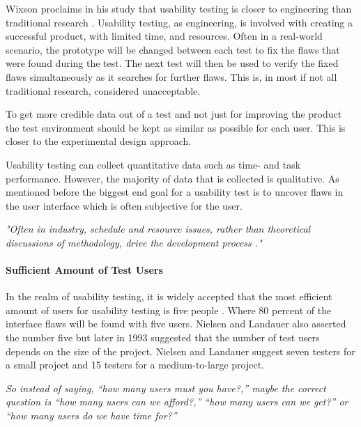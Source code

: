 Wixson proclaims in his study that usability testing is closer to engineering than traditional research \cite{wixon2003evaluating}. Usability testing, as engineering, is involved with creating a successful product, with limited time, and resources. Often in a real-world scenario, the prototype will be changed between each test to fix the flaws that were found during the test. The next test will then be used to verify the fixed flaws simultaneously as it searches for further flaws. This is, in most if not all traditional research, considered unacceptable. 

To get more credible data out of a test and not just for improving the product the test environment should be kept as similar as possible for each user. This is closer to the experimental design approach. 

Usability testing can collect quantitative data such as time- and task performance. However, the majority of data that is collected is qualitative. As mentioned before the biggest end goal for a usability test is to uncover flaws in the user interface which is often subjective for the user.

\textit{"Often in industry, schedule and resource issues, rather than theoretical discussions of methodology, drive the development process \cite{wixon2003evaluating}."}

\paragraph{Sufficient Amount of Test Users}
\label{ssub:Sufficient Amount of Test Users}

In the realm of usability testing, it is widely accepted that the most efficient amount of users for usability testing is five people \cite{virzi1992refining}. Where 80 percent of the interface flaws will be found with five users. Nielsen and Landauer also asserted the number five but later in 1993 suggested that the number of test users depends on the size of the project\cite{nielsen1993mathematical}. Nielsen and Landauer suggest seven testers for a small project and 15 testers for a medium-to-large project. 


\textit{
So instead of saying, “how many users must you have?,” maybe the correct question is “how many users can we afford?,” “how many users can we get?” or “how many users do we have time for?”
} \cite{lazar2017research} 




